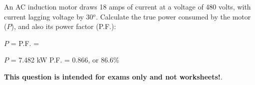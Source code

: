 

An AC induction motor draws 18 amps of current at a voltage of 480 volts, with current lagging voltage by 30$^{o}$.  Calculate the true power consumed by the motor ($P$), and also its power factor (P.F.):

\vskip 10pt

$P$ = \hskip 150pt P.F. = 







$P$ = 7.482 kW \hskip 100pt P.F. = 0.866, or 86.6\%







{\bf This question is intended for exams only and not worksheets!}.



